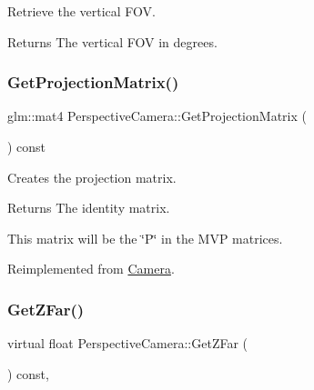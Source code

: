 Retrieve the vertical F\+OV.

\begin{DoxyReturn}{Returns}
The vertical F\+OV in degrees.
\end{DoxyReturn}
\hypertarget{class_perspective_camera_ab467388c7d3e4c2ef9b498c16f291545}{}\label{class_perspective_camera_ab467388c7d3e4c2ef9b498c16f291545}
\subsubsection{\texorpdfstring{Get\+Projection\+Matrix()}{GetProjectionMatrix()}}
{\footnotesize\ttfamily glm\+::mat4 Perspective\+Camera\+::\+Get\+Projection\+Matrix (\begin{DoxyParamCaption}{ }\end{DoxyParamCaption}) const\hspace{0.3cm}{\ttfamily [virtual]}}



Creates the projection matrix.

\begin{DoxyReturn}{Returns}
The identity matrix.
\end{DoxyReturn}
This matrix will be the \char`\"{}\+P\char`\"{} in the M\+VP matrices.

Reimplemented from \hyperlink{class_camera_af6f4415189deaff158ba86f0b3527a30}{Camera}.

\hypertarget{class_perspective_camera_ae2e2bbd9e4bb5126c6f1de1606cd9c3e}{}\label{class_perspective_camera_ae2e2bbd9e4bb5126c6f1de1606cd9c3e}
\subsubsection{\texorpdfstring{Get\+Z\+Far()}{GetZFar()}}
{\footnotesize\ttfamily virtual float Perspective\+Camera\+::\+Get\+Z\+Far (\begin{DoxyParamCaption}{ }\end{DoxyParamCaption}) const\hspace{0.3cm}{\ttfamily [inline]}, {\ttfamily [virtual]}}

\hypertarget{class_perspective_camera_ad9bd7e6bccb38c178dbd90d8d0a5778b}{}\label{class_perspective_camera_ad9bd7e6bccb38c178dbd90d8d0a5778b}
